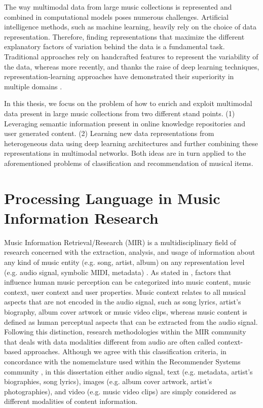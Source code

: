 The way multimodal data from large music collections is represented and combined in computational models poses numerous challenges. Artificial intelligence methods, such as machine learning, heavily rely on the choice of data representation. Therefore, finding representations that maximize the different explanatory factors of variation behind the data is a fundamental task. Traditional approaches rely on handcrafted features to represent the variability of the data, whereas more recently, and thanks the raise of deep learning techniques, representation-learning approaches have demonstrated their superiority in multiple domains \cite{bengio2013representation}.

In this thesis, we focus on the problem of how to enrich and exploit multimodal data present in large music collections from two different stand points. (1) Leveraging semantic information present in online knowledge repositories and user generated content. (2) Learning new data representations from heterogeneous data using deep learning architectures and further combining these representations in multimodal networks. Both ideas are in turn applied to the aforementioned problems of classification and recommendation of musical items.


\section{Processing Language in Music Information Research}
\label{sec:intro:nlp}

Music Information Retrieval/Research (MIR) is a multidisciplinary field of research concerned with the extraction, analysis, and usage of information about any kind of music entity (e.g. song, artist, album) on any representation level (e.g. audio signal, symbolic MIDI, metadata) \cite{schedl2008}. As stated in \cite{Schedl2013}, factors that influence human music perception can be categorized into music content, music context, user context and user properties. Music context relates to all musical aspects that are not encoded in the audio signal, such as song lyrics, artist's biography, album cover artwork or music video clips, whereas music content is defined as human perceptual aspects that can be extracted from the audio signal. Following this distinction, research methodologies within the MIR community that deals with data modalities different from audio are often called context-based approaches. 
Although we agree with this classification criteria, in concordance with the nomemclature used within the Recommender Systems community \cite{Ostuni2013}, in this dissertation either audio signal, text (e.g. metadata, artist's biographies, song lyrics), images (e.g. album cover artwork, artist's photographies), and video (e.g. music video clips) are simply considered as different modalities of content information.

